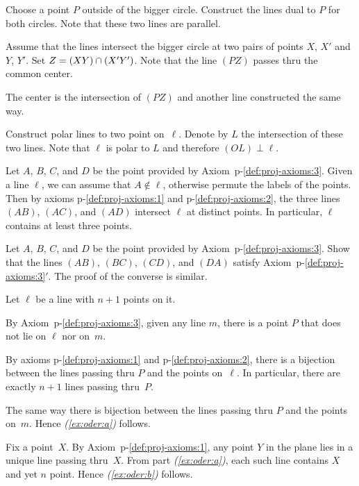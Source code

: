 Choose a point $P$ outside of the bigger circle.
Construct the lines dual to $P$ for both circles.
Note that these two lines are parallel. 

Assume that the lines intersect the bigger circle at two pairs of points $X$, $X'$ and $Y$, $Y'$.
Set $Z\z=(XY)\cap (X'Y')$.
Note that the line $(PZ)$ passes thru the common center.

The center is the intersection of $(PZ)$ and another line constructed the same way.

Construct polar lines to two point on~$\ell$.
Denote by $L$ the intersection of these two lines.
Note that $\ell$ is polar to $L$ and therefore $(OL)\perp \ell$.

Let $A$, $B$, $C$, and $D$ 
be the point provided by Axiom~p-\ref{def:proj-axioms:3}.
Given a line $\ell$, we can assume that $A\notin \ell$, 
otherwise permute the labels of the points.
Then by axioms p-\ref{def:proj-axioms:1} and p-\ref{def:proj-axioms:2},
the three lines $(AB)$, $(AC)$, and $(AD)$ intersect $\ell$ at distinct points.
In particular, $\ell$ contains at least three points. 

Let $A$, $B$, $C$, and $D$ 
be the point provided by Axiom~p-\ref{def:proj-axioms:3}.
Show that the lines $(AB)$, $(BC)$, $(CD)$, and $(DA)$
satisfy Axiom~p-\ref{def:proj-axioms:3}$'$.
The proof of the converse is similar.

Let $\ell$ be a line with $n+1$ points on it.

By Axiom~p-\ref{def:proj-axioms:3}, given any line $m$, there is a point $P$ that does not lie on $\ell$ nor on~$m$.

By axioms p-\ref{def:proj-axioms:1} and p-\ref{def:proj-axioms:2}, there is a bijection between the lines passing thru $P$ and the points on~$\ell$.
In particular, there are exactly $n+1$ lines passing thru~$P$.

The same way there is bijection between the lines passing thru $P$ and the points on~$m$. 
Hence \textit{(\ref{ex:oder:a})} follows.

Fix a point~$X$.
By Axiom~p-\ref{def:proj-axioms:1}, any point $Y$ in the plane lies in a unique line passing thru~$X$.
From part \textit{(\ref{ex:oder:a})}, each such line contains $X$ and yet $n$ point.
Hence \textit{(\ref{ex:oder:b})} follows.

